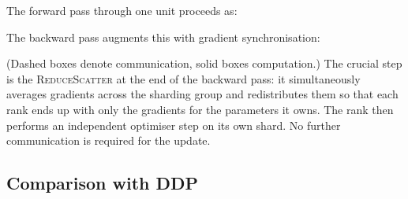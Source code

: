 \documentclass[11pt,a4paper]{article}
\theoremstyle{definition}
\theoremstyle{remark}
\newcommand{\AllGather}{\textsc{AllGather}}
\newcommand{\ReduceScatter}{\textsc{ReduceScatter}}
\begin{document}
The forward pass through one unit proceeds as:

\begin{center}
\end{center}

The backward pass augments this with gradient synchronisation:

\begin{center}
\end{center}

(Dashed boxes denote communication, solid boxes computation.) The crucial step is the \ReduceScatter{} at the end of the backward pass: it simultaneously averages gradients across the sharding group and redistributes them so that each rank ends up with only the gradients for the parameters it owns. The rank then performs an independent optimiser step on its own shard. No further communication is required for the update.

\subsection{Comparison with DDP}
\end{document}
